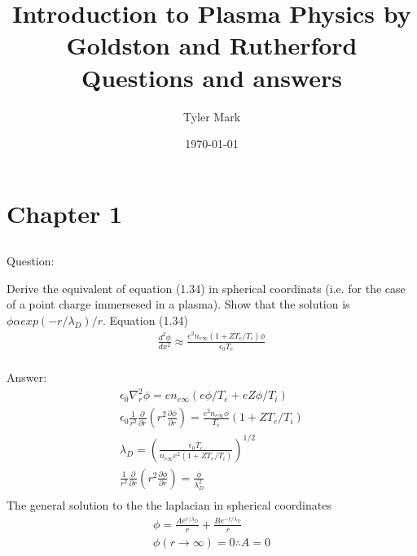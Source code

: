 \documentclass{article}
\author{Tyler Mark}
\newcommand{\partialrn}{\frac{\partial}{\partial r}}
\newcommand{\partialr}[1]{\frac{\partial #1}{\partial r}}
\begin{document}
\title{Introduction to Plasma Physics by Goldston and Rutherford Questions and answers}

\pagestyle{fancy}
\date{\today}
\maketitle
\tableofcontents

\section{Chapter 1}
\subsection{}
\subsection{}
\subsection{}

Question:

Derive the equivalent of equation (1.34) in spherical coordinats (i.e. for the case of a point charge immersesed in a plasma). Show that the solution is $\phi \alpha exp(-r/\lambda_D)/r$.
Equation (1.34)
\begin{eqnarray*}
    \frac{d^2\phi}{dx^2}\approx \frac{e^2n_{e\infty}(1+ZT_e/T_i)\phi}{\epsilon_0T_e}\\
\end{eqnarray*}

Answer:
\begin{eqnarray*}
    \epsilon_0\nabla^2_r\phi=en_{e\infty}(e\phi/T_e+eZ\phi/T_i)\\
    \epsilon_0\frac{1}{r^2}\partialrn(r^2\partialr{\phi})=\frac{e^2n_{e\infty}\phi}{T_e}(1+ZT_e/T_i)\\
    \lambda_D=(\frac{\epsilon_0 T_e}{n_{e\infty}e^2(1+ZT_e/T_i)})^{1/2}\\
    \frac{1}{r^2}\partialrn(r^2\partialr{\phi})=\frac{\phi}{\lambda_D^2}\\
\end{eqnarray*}
The general solution to the the laplacian in spherical coordinates
\begin{eqnarray*}
    \phi=\frac{Ae^{r/\lambda_D}}{r}+\frac{Be^{-r/\lambda_D}}{r}\\
    \phi(r\rightarrow \infty)=0 \therefore A=0\\
\end{eqnarray*}
\end{document}
